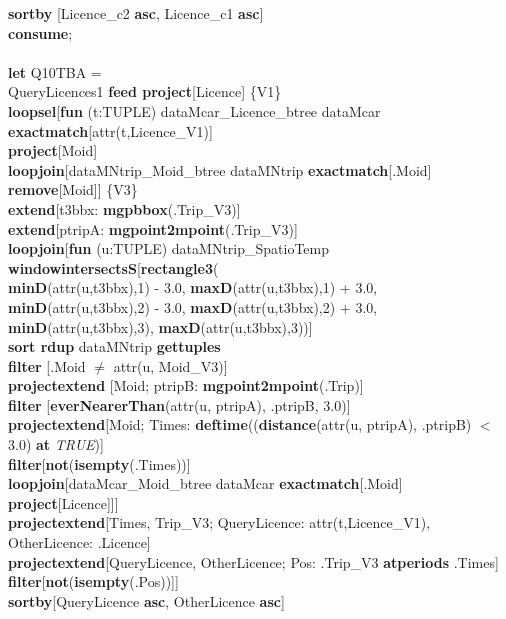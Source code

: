 \documentclass[a4paper]{article}
\newcommand{\op}[1]{\textbf{#1}}
\newcommand{\true}{\textsl{TRUE}}
\begin{document}
\begin{scriptsize}
\begin{tabbing}
\>\op{sortby} [Licence\_c2 \op{asc}, Licence\_c1 \op{asc}]\\
\op{consume};\\
\\
\op{let} Q10TBA =\\
\>QueryLicences1 \op{feed project}[Licence] \{V1\}\\
\>\op{loopsel}[\op{fun} (t:TUPLE) dataMcar\_Licence\_btree dataMcar
\op{exactmatch}[attr(t,Licence\_V1)]\\
\>\>\op{project}[Moid]\\
\>\>\op{loopjoin}[dataMNtrip\_Moid\_btree dataMNtrip
\op{exactmatch}[.Moid] \op{remove}[Moid]] \{V3\}\\
\>\>\op{extend}[t3bbx: \op{mgpbbox}(.Trip\_V3)]\\
\>\>\op{extend}[ptripA: \op{mgpoint2mpoint}(.Trip\_V3)]\\
\>\>\op{loopjoin}[\op{fun} (u:TUPLE) dataMNtrip\_SpatioTemp
\op{windowintersectsS}[\op{rectangle3}(\\
\>\>\>\>\op{minD}(attr(u,t3bbx),1) - 3.0, \op{maxD}(attr(u,t3bbx),1) + 3.0,\\
\>\>\>\>\op{minD}(attr(u,t3bbx),2) - 3.0, \op{maxD}(attr(u,t3bbx),2) + 3.0,\\
\>\>\>\>\op{minD}(attr(u,t3bbx),3), \op{maxD}(attr(u,t3bbx),3))]\\
\>\>\>\op{sort rdup} dataMNtrip \op{gettuples}\\
\>\>\>\op{filter} [.Moid $\neq$ attr(u, Moid\_V3)]\\
\>\>\>\op{projectextend} [Moid; ptripB: \op{mgpoint2mpoint}(.Trip)]\\
\>\>\>\op{filter} [\op{everNearerThan}(attr(u, ptripA), .ptripB, 3.0)]\\
\>\>\>\op{projectextend}[Moid; Times: \op{deftime}((\op{distance}(attr(u,
ptripA), .ptripB) $<$ 3.0) \op{at} \true{})]\\
\>\>\>\op{filter}[\op{not}(\op{isempty}(.Times))]\\
\>\>\>\op{loopjoin}[dataMcar\_Moid\_btree dataMcar
\op{exactmatch}[.Moid] \op{project}[Licence]]]\\
\>\>\op{projectextend}[Times, Trip\_V3; QueryLicence: attr(t,Licence\_V1),
OtherLicence: .Licence]\\
\>\>\op{projectextend}[QueryLicence, OtherLicence; Pos: .Trip\_V3
\op{atperiods} .Times]\\
\>\>\op{filter}[\op{not}(\op{isempty}(.Pos))]]\\
\>\op{sortby}[QueryLicence \op{asc}, OtherLicence \op{asc}]\\

\end{tabbing}
\end{scriptsize}
\end{document}
